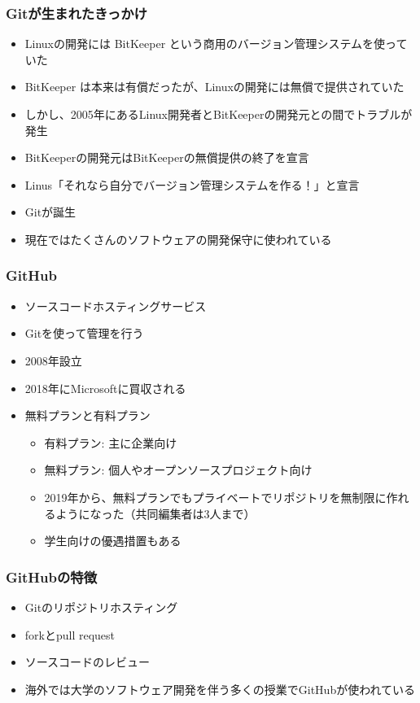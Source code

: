 \documentclass[dvipdfmx]{beamer}
\begin{document}
\begin{frame}
    \frametitle{Gitが生まれたきっかけ \cite{git}}
    \large
    \begin{itemize}
        \item<1-> Linuxの開発には BitKeeper という商用のバージョン管理システムを使っていた
        \item<2-> BitKeeper は本来は有償だったが、Linuxの開発には無償で提供されていた
        \item<3-> しかし、2005年にあるLinux開発者とBitKeeperの開発元との間でトラブルが発生
        \item<4-> BitKeeperの開発元はBitKeeperの無償提供の終了を宣言
        \item<5-> Linus「それなら自分でバージョン管理システムを作る！」と宣言
        \item<6-> Gitが誕生 \cite{git-linux}
        \item<7-> 現在ではたくさんのソフトウェアの開発保守に使われている
    \end{itemize}
\end{frame}

\begin{frame}
    \frametitle{GitHub}
    \large
    \begin{itemize}
        \item ソースコードホスティングサービス
        \item Gitを使って管理を行う
        \item 2008年設立
        \item 2018年にMicrosoftに買収される
        \item 無料プランと有料プラン
        \begin{itemize}
            \item 有料プラン: 主に企業向け
            \item 無料プラン: 個人やオープンソースプロジェクト向け
            \item 2019年から、無料プランでもプライベートでリポジトリを無制限に作れるようになった（共同編集者は3人まで）
            \item 学生向けの優遇措置もある
        \end{itemize}
    \end{itemize}
\end{frame}

\begin{frame}
    \frametitle{GitHubの特徴}
    \large
    \begin{itemize}
        \item Gitのリポジトリホスティング
        \item forkとpull request
        \item ソースコードのレビュー
        \item 海外では大学のソフトウェア開発を伴う多くの授業でGitHubが使われている
    \end{itemize}
\end{frame}
\end{document}
